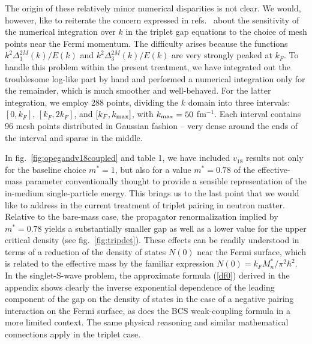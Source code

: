 The origin of these relatively minor numerical disparities
is not clear.  We would, however, like to reiterate the concern
expressed in refs.~\cite{elgaroy,catoslo} about the sensitivity
of the numerical integration over $k$ in the triplet gap equations
to the choice of mesh points near the Fermi momentum.  The
difficulty arises because the functions $k^2 \Delta_1^{2M}(k)/E(k)$
and $k^2 \Delta_3^{2M}(k)/E(k)$ are very strongly peaked at
$k_F$.  To handle this problem within the present treatment,
we have integrated out the troublesome log-like part by hand
and performed a numerical integration only for the remainder,
which is much smoother and well-behaved.  For the latter integration,
we employ 288 points, dividing the $k$ domain into three intervals:
$[0,k_F]$, $[k_F,2k_F]$, and $[k_F,k_{\rm max}]$, with 
$k_{\rm max}= 50$ fm$^{-1}$.  Each interval contains 96 mesh
points distributed in Gaussian fashion -- very dense around the
ends of the interval and sparse in the middle.

In fig.~\ref{fig:opegandv18coupled} and table 1, we have included 
$v_{18}$ results not only for the baseline choice $m^*=1$, but also 
for a value $m^*=0.78$ of the effective-mass parameter conventionally
thought \cite{t72,ttr} to provide a sensible representation
of the in-medium single-particle energy.  This brings us to
the last point that we would like to address in the current
treatment of triplet pairing in neutron matter.  
Relative to the bare-mass case, the propagator renormalization implied 
by $m^*=0.78$ yields a substantially smaller gap as well as a lower 
value for the upper critical density (see fig.~\ref{fig:tripdet}).
These effects can be readily understood in terms of a reduction of
the density of states $N(0)$ near the Fermi surface, which is related 
to the effective mass by the familiar expression
$N(0)= k_FM_n^* / \pi^2 \hbar^2$.  In the singlet-S-wave problem, the
approximate formula (\ref{df0}) derived in the appendix shows clearly 
the inverse exponential dependence of the leading component of 
the gap on the density of states in the case of a negative pairing 
interaction on the Fermi surface, as does the BCS weak-coupling 
formula in a more limited context.  The same physical reasoning and 
similar mathematical connections apply in the triplet case.  

